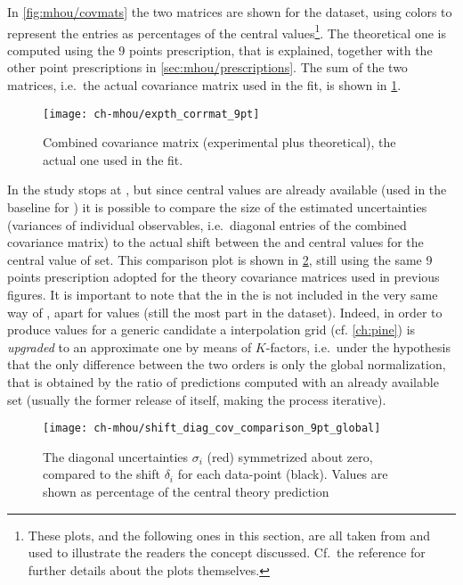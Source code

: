 In \cref{fig:mhou/covmats} the two matrices are shown for the 
dataset, using colors to represent the entries as percentages of the central
values\footnote{
  These plots, and the following ones in this section, are all taken from
  \cite{NNPDF:2019ubu} and used to illustrate the readers the concept
  discussed.
  Cf.\ the reference for further details about the plots themselves.
}.
The theoretical one is computed using the 9 points prescription, that is
explained, together with the other point prescriptions in
\cref{sec:mhou/prescriptions}.
%
The sum of the two matrices, i.e.\ the actual covariance matrix used in the
 fit, is shown in \cref{fig:mhou/combined-covmat}.

\begin{figure}
	\centering
	\texttt{[image: ch-mhou/expth\_corrmat\_9pt]}
	\caption{
		Combined covariance matrix (experimental plus theoretical), the actual
		one used in the  fit.
	}
	\label{fig:mhou/combined-covmat}
\end{figure}

In \cite{NNPDF:2019ubu} the \mhou study stops at \nlo, but since \nnlo central
values are already available (used in the baseline for ) it is possible 
to compare the size of the estimated uncertainties (variances of individual
observables, i.e.\ diagonal entries of the combined covariance matrix) to the
actual shift between the \nlo and \nnlo central values for the central value of
 \pdf set.
%
This comparison plot is shown in \cref{fig:mhou/scvar-shifts}, still using the
same 9 points prescription adopted for the theory covariance matrices used in
previous figures.
%
It is important to note that the \nnlo in the \pdf is not included in the very
same way of \nlo, apart for \dis values (still the most part in the
 dataset).
Indeed, in order to produce \nnlo values for a generic \pdf candidate a \nlo
interpolation grid (cf. \cref{ch:pine}) is \textit{upgraded} to an approximate
\nnlo one by means of $K$-factors, i.e.\ under the hypothesis that the only
difference between the two orders is only the global normalization, that is
obtained by the ratio of predictions computed with an already available \pdf
set (usually the former release of \nnpdf itself, making the process
iterative).

\begin{figure}
	\centering
	\texttt{[image: ch-mhou/shift\_diag\_cov\_comparison\_9pt\_global]}
	\caption{
		The diagonal uncertainties $\sigma_i$ (red) symmetrized about zero,
		compared to the shift $\delta_i$ for each data-point (black).
		Values are shown as percentage of the central theory prediction
	}
	\label{fig:mhou/scvar-shifts}
\end{figure}

